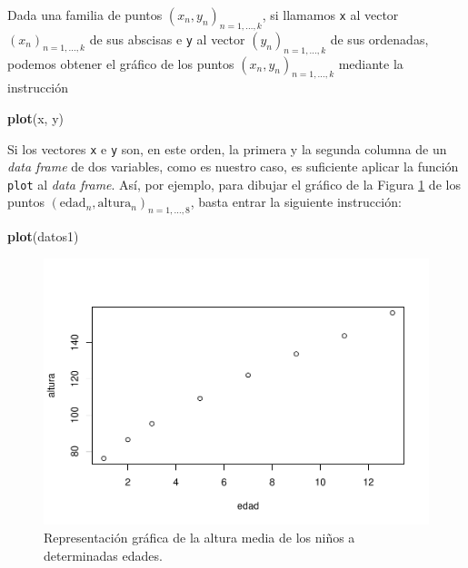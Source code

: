 \documentclass[
]{book}
\newenvironment{Shaded}{\begin{snugshade}}{\end{snugshade}}
\newcommand{\KeywordTok}[1]{\textcolor[rgb]{0.13,0.29,0.53}{\textbf{#1}}}
\newcommand{\NormalTok}[1]{#1}
\theoremstyle{definition}
\theoremstyle{definition}
\theoremstyle{definition}
\theoremstyle{remark}
\begin{document}
Dada una familia de puntos \((x_n,y_n)_{n=1,\ldots,k}\), si llamamos \texttt{x} al vector \((x_n)_{n=1,\ldots,k}\) de sus abscisas e \texttt{y} al vector \((y_n)_{n=1,\ldots,k}\) de sus ordenadas, podemos obtener el gráfico de los puntos \((x_n,y_n)_{n=1,\ldots,k}\) mediante la instrucción

\begin{Shaded}
\begin{Highlighting}[]
\KeywordTok{plot}\NormalTok{(x, y)}
\end{Highlighting}
\end{Shaded}

Si los vectores \texttt{x} e \texttt{y} son, en este orden, la primera y la segunda columna de un \emph{data frame} de dos variables, como es nuestro caso, es suficiente aplicar la función \texttt{plot} al \emph{data frame}.
Así, por ejemplo, para dibujar el gráfico de la Figura \ref{fig:A301} de los puntos \((\mathrm{edad}_n,\textrm{altura}_n)_{n=1,\ldots,8}\), basta entrar la siguiente instrucción:

\begin{Shaded}
\begin{Highlighting}[]
\KeywordTok{plot}\NormalTok{(datos1)}
\end{Highlighting}
\end{Shaded}

\begin{figure}

{\centering \includegraphics[width=0.9\linewidth]{03chap02_Un_aperitivo_files/figure-latex/A301-1} 

}

\caption{Representación gráfica de la altura media de los niños a determinadas edades.}\label{fig:A301}
\end{figure}
\end{document}
